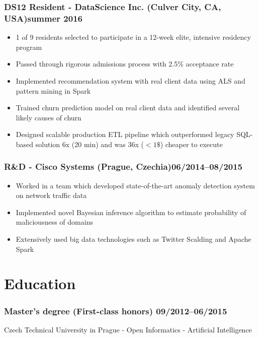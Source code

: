 \documentclass[11pt]{article}
\begin{document}
\subsubsection*{\bf DS12 Resident - DataScience Inc. (Culver City, CA, USA)\hfill summer 2016}
	 \begin{itemize}
		\setlength\itemsep{-0.25em}
		\item 1 of 9 residents selected to participate in a 12-week elite, intensive residency program
		\item Passed through rigorous admissions process with 2.5\% acceptance rate
		\item Implemented recommendation system with real client data using ALS and pattern mining in Spark
		\item Trained churn prediction model on real client data and identified several likely causes of churn
		\item Designed scalable production ETL pipeline which outperformed legacy SQL-based solution 6x (20 min) and was 36x ($< 1\$$) cheaper to execute
	 \end{itemize}

\subsubsection*{R\&D - Cisco Systems (Prague, Czechia)\hfill 06/2014--08/2015}
	 \begin{itemize}
		\setlength\itemsep{-0.25em}
		\item Worked in a team which developed state-of-the-art anomaly detection system on network traffic data
		\item Implemented novel Bayesian inference algorithm to estimate probability of maliciousness of domains
		\item Extensively used big data technologies such as Twitter Scalding and Apache Spark
	 \end{itemize}

\section*{Education}
\subsubsection*{\bf Master’s degree (First-class honors) \hfill 09/2012--06/2015}
\vspace{-1.5mm}
Czech Technical University in Prague - Open Informatics - Artificial Intelligence
\vspace{-1.5mm}
\end{document}
